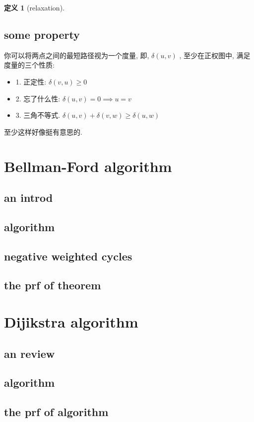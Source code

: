 \documentclass[a4paper, 10pt]{ctexart} %
\newtheorem{definition}{定义}
\begin{document}
\begin{definition}[relaxation]

\end{definition}
\subsection{some property}

你可以将两点之间的最短路径视为一个度量, 即, $\delta \left(u ,v\right)$ , 至少在正权图中, 满足度量的三个性质: 

\begin{itemize}
    \item 
    1. 正定性: $\delta \left(v, u\right) \ge 0$
    \item 
    2. 忘了什么性: $\delta \left(u,v\right) = 0   \implies u = v$ 
    \item
    3. 三角不等式. $\delta (u, v ) + \delta \left(v , w\right) \ge \delta (u ,w)$
\end{itemize}

至少这样好像挺有意思的. 
\section{Bellman-Ford algorithm}
\subsection{an introd}
\subsection{algorithm}
\subsection{negative weighted cycles}
\subsection{the prf of theorem}
\section{Dijikstra algorithm}
\subsection{an review}
\subsection{algorithm}
\subsection{the prf of algorithm}
\end{document}
